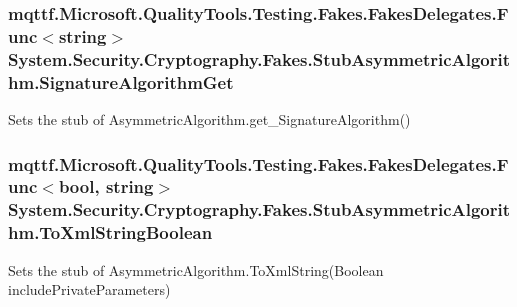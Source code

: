 \hypertarget{class_system_1_1_security_1_1_cryptography_1_1_fakes_1_1_stub_asymmetric_algorithm_a8a917fb9255d2cacf4aec9fc6c272b7a}{
\subsubsection[{Signature\-Algorithm\-Get}]{\setlength{\rightskip}{0pt plus 5cm}mqttf.\-Microsoft.\-Quality\-Tools.\-Testing.\-Fakes.\-Fakes\-Delegates.\-Func$<$string$>$ System.\-Security.\-Cryptography.\-Fakes.\-Stub\-Asymmetric\-Algorithm.\-Signature\-Algorithm\-Get}}\label{class_system_1_1_security_1_1_cryptography_1_1_fakes_1_1_stub_asymmetric_algorithm_a8a917fb9255d2cacf4aec9fc6c272b7a}


Sets the stub of Asymmetric\-Algorithm.\-get\-\_\-\-Signature\-Algorithm()

\hypertarget{class_system_1_1_security_1_1_cryptography_1_1_fakes_1_1_stub_asymmetric_algorithm_a5b7d68a7be790341fdf9fc7a4cfb8f64}{
\subsubsection[{To\-Xml\-String\-Boolean}]{\setlength{\rightskip}{0pt plus 5cm}mqttf.\-Microsoft.\-Quality\-Tools.\-Testing.\-Fakes.\-Fakes\-Delegates.\-Func$<$bool, string$>$ System.\-Security.\-Cryptography.\-Fakes.\-Stub\-Asymmetric\-Algorithm.\-To\-Xml\-String\-Boolean}}\label{class_system_1_1_security_1_1_cryptography_1_1_fakes_1_1_stub_asymmetric_algorithm_a5b7d68a7be790341fdf9fc7a4cfb8f64}


Sets the stub of Asymmetric\-Algorithm.\-To\-Xml\-String(\-Boolean include\-Private\-Parameters)




